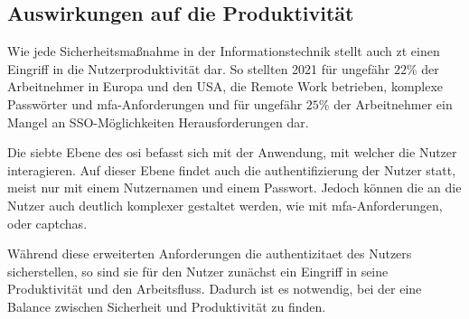 \subsection{Auswirkungen auf die Produktivität}\label{subsec:auswirkungen-auf-die-produktivitat}
Wie jede Sicherheitsmaßnahme in der Informationstechnik stellt auch \ac{zt} einen Eingriff in die Nutzerproduktivität dar.
So stellten 2021 für ungefähr $22\%$ der Arbeitnehmer in Europa und den USA, die Remote Work betrieben, komplexe Passwörter und \ac{mfa}-Anforderungen und für ungefähr $25\%$ der Arbeitnehmer ein Mangel an \ac{SSO}-Möglichkeiten Herausforderungen dar.\autocite[\vglf][]{citrix-2021}

Die siebte Ebene des \gls{osi} befasst sich mit der Anwendung, mit welcher die Nutzer interagieren.
Auf dieser Ebene findet auch die \gls{authentifizierung} der Nutzer statt, meist nur mit einem Nutzernamen und einem Passwort.
Jedoch können die  an die Nutzer auch deutlich komplexer gestaltet werden, wie \zb mit \ac{mfa}-Anforderungen, oder \glspl{captcha}.

Während diese erweiterten Anforderungen die \gls{authentizitaet} des Nutzers sicherstellen, so sind sie für den Nutzer zunächst ein Eingriff in seine Produktivität und den Arbeitsfluss.
Dadurch ist es notwendig, bei der  eine Balance zwischen Sicherheit und Produktivität zu finden\autocite[\vglf][]{pace-2004}.